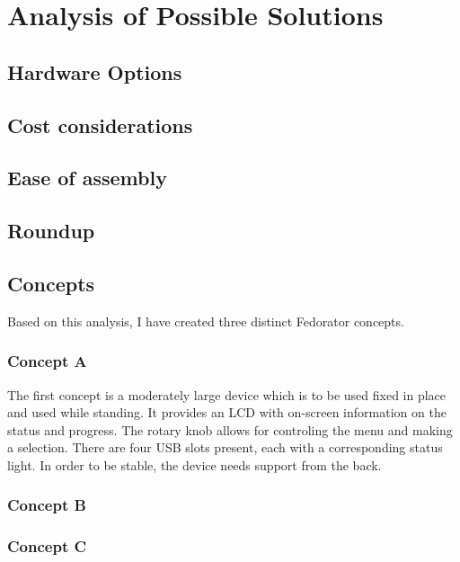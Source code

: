 \chapter{Analysis of Possible Solutions}
    \section{Hardware Options}
        \blind[4]
    \section{Cost considerations}
        \blind[2]
    \section{Ease of assembly}
        \blind[2]
    \section{Roundup}
        \blind[2]
    \section{Concepts}
        Based on this analysis, I have created three distinct Fedorator concepts.
        \subsection{Concept A}
            The first concept is a moderately large device which is to be used fixed in place and used while standing.  It provides an LCD with on-screen information on the status and progress.  The rotary knob allows for controling the menu and making a selection.  There are four USB slots present, each with a corresponding status light.  In order to be stable, the device needs support from the back.
            
            \blind[1]
        \subsection{Concept B}
            \blind[2]
        \subsection{Concept C}
            \blind[2]
